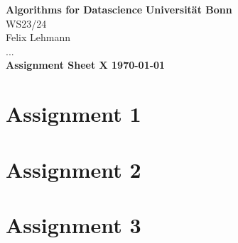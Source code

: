 \documentclass[DIN, pagenumber=false, fontsize=11pt, parskip=half]{scrartcl}
\renewcommand{\title}[1]{{\noindent\Large\textbf{#1}}}
\begin{document}
\noindent\textbf{Algorithms for Datascience} \hfill \textbf{Universität Bonn}\\
WS23/24 \hfill \\
Felix Lehmann \\
... \\

\title{Assignment Sheet X \hfill \today}

\section*{Assignment 1}

\section*{Assignment 2}

\section*{Assignment 3}
\end{document}
